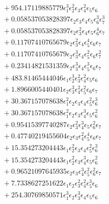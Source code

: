 \documentclass[10pt]{article}
\begin{document}
\begin{align*}
&{}  + 954.17119885779 \epsilon_{1}^{3} \epsilon_{2}^{2} \epsilon_{3} \epsilon_{4}^{2} \epsilon_{5} \epsilon_{6} \\
&{}  + 0.058537053828397 \epsilon_{2} \epsilon_{3} \epsilon_{4} \epsilon_{5} \epsilon_{6}^{3} \epsilon_{7}^{3} \\
&{}  + 0.058537053828397 \epsilon_{2} \epsilon_{3}^{2} \epsilon_{4} \epsilon_{5} \epsilon_{6}^{4} \epsilon_{7} \\
&{}  + 0.11707410765679 \epsilon_{2} \epsilon_{3}^{2} \epsilon_{4} \epsilon_{5}^{4} \epsilon_{6} \epsilon_{7} \\
&{}  + 0.11707410765679 \epsilon_{2} \epsilon_{3}^{3} \epsilon_{4} \epsilon_{5}^{2} \epsilon_{6} \epsilon_{7}^{2} \\
&{}  + 0.23414821531359 \epsilon_{2} \epsilon_{3}^{3} \epsilon_{4} \epsilon_{5}^{3} \epsilon_{6} \epsilon_{7} \\
&{}  + 483.81465444046 \epsilon_{1} \epsilon_{2}^{3} \epsilon_{3}^{2} \epsilon_{4}^{2} \epsilon_{5} \epsilon_{6} \\
&{}  + 1.8966005440401 \epsilon_{2} \epsilon_{3}^{3} \epsilon_{4}^{2} \epsilon_{5}^{2} \epsilon_{6} \epsilon_{7} \\
&{}  + 30.367157078638 \epsilon_{1}^{2} \epsilon_{2} \epsilon_{3} \epsilon_{4} \epsilon_{5}^{2} \epsilon_{6}^{3} \\
&{}  + 30.367157078638 \epsilon_{1}^{2} \epsilon_{2} \epsilon_{3} \epsilon_{4}^{3} \epsilon_{5} \epsilon_{6}^{2} \\
&{}  + 0.95415397740287 \epsilon_{2} \epsilon_{3}^{2} \epsilon_{4}^{3} \epsilon_{5} \epsilon_{6}^{2} \epsilon_{7} \\
&{}  + 0.47740219455604 \epsilon_{2} \epsilon_{3} \epsilon_{4}^{2} \epsilon_{5}^{4} \epsilon_{6} \epsilon_{7} \\
&{}  + 15.354273204443 \epsilon_{1} \epsilon_{2}^{2} \epsilon_{3} \epsilon_{4} \epsilon_{5}^{2} \epsilon_{6}^{3} \\
&{}  + 15.354273204443 \epsilon_{1} \epsilon_{2}^{2} \epsilon_{3} \epsilon_{4}^{3} \epsilon_{5} \epsilon_{6}^{2} \\
&{}  + 0.96521097645935 \epsilon_{2} \epsilon_{3} \epsilon_{4}^{3} \epsilon_{5}^{2} \epsilon_{6}^{2} \epsilon_{7} \\
&{}  + 7.7338627251622 \epsilon_{1} \epsilon_{2} \epsilon_{3}^{2} \epsilon_{4}^{2} \epsilon_{5}^{3} \epsilon_{6} \\
&{}  + 254.30769850571 \epsilon_{1}^{3} \epsilon_{2} \epsilon_{3}^{3} \epsilon_{4} \epsilon_{5} \epsilon_{6} \\

\end{align*}
\end{document}
